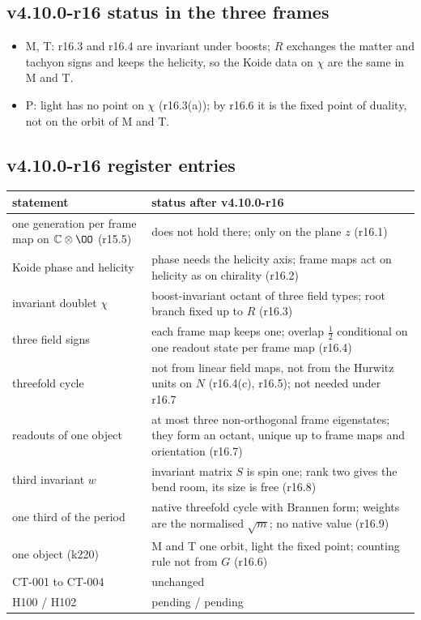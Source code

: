 \subsection*{v4.10.0-r16 status in the three frames}
\label{subsec:v4100-r16-frames}

\begin{itemize}[leftmargin=2em]
\item M, T: r16.3 and r16.4 are invariant under boosts; \(R\) exchanges the matter and tachyon signs and keeps the helicity,
so the Koide data on \(\chi\) are the same in M and T.
\item P: light has no point on \(\chi\) (r16.3(a)); by r16.6 it is the fixed point of duality, not on the orbit of M and T.
\end{itemize}

\subsection*{v4.10.0-r16 register entries}
\label{subsec:v4100-r16-register}

\begin{center}
\small
\begin{tabular}{@{}>{\raggedright\arraybackslash}p{}>{\raggedright\arraybackslash}p{}@{}}
\toprule
statement & status after v4.10.0-r16\\
\midrule
one generation per frame map on \(\mathbb C\otimes\OO\) (r15.5) & does not hold there; only on the plane \(z\) (r16.1)\\
Koide phase and helicity & phase needs the helicity axis; frame maps act on helicity as on chirality (r16.2)\\
invariant doublet \(\chi\) & boost-invariant octant of three field types; root branch fixed up to \(R\) (r16.3)\\
three field signs & each frame map keeps one; overlap \(\tfrac12\) conditional on one readout state per frame map (r16.4)\\
threefold cycle & not from linear field maps, not from the Hurwitz units on \(N\) (r16.4(c), r16.5); not needed under r16.7\\
readouts of one object & at most three non-orthogonal frame eigenstates; they form an octant, unique up to frame maps and orientation (r16.7)\\
third invariant \(w\) & invariant matrix \(S\) is spin one; rank two gives the bend room, its size is free (r16.8)\\
one third of the period & native threefold cycle with Brannen form; weights are the normalised \(\sqrt m\); no native value (r16.9)\\
one object (k220) & M and T one orbit, light the fixed point; counting rule not from \(G\) (r16.6)\\
CT-001 to CT-004 & unchanged\\
H100 / H102 & pending / pending\\
\bottomrule
\end{tabular}
\end{center}

